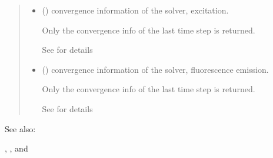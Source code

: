 \documentclass[letterpaper,10pt,english]{sphinxmanual}
\begin{document}
\begin{fulllineitems}
\begin{quote}
\begin{description}
\begin{itemize}
\sphinxAtStartPar
See {\hyperref[\detokenize{_autosummary/nirfasterff.base.data.flTPSFdata:nirfasterff.base.data.flTPSFdata}]{}} for details.

\item {} 
\sphinxAtStartPar
{} () \textendash{} convergence information of the solver, excitation.

\sphinxAtStartPar
Only the convergence info of the last time step is returned.

\sphinxAtStartPar
See {\hyperref[\detokenize{_autosummary/nirfasterff.utils.ConvergenceInfo:nirfasterff.utils.ConvergenceInfo}]{}} for details

\item {} 
\sphinxAtStartPar
{} () \textendash{} convergence information of the solver, fluorescence emission.

\sphinxAtStartPar
Only the convergence info of the last time step is returned.

\sphinxAtStartPar
See {\hyperref[\detokenize{_autosummary/nirfasterff.utils.ConvergenceInfo:nirfasterff.utils.ConvergenceInfo}]{}} for details

\end{itemize}


\end{description}\end{quote}


\begin{sphinxseealso}{See also:}

\sphinxAtStartPar
{\hyperref[\detokenize{_autosummary/nirfasterff.math.gen_mass_matrix:nirfasterff.math.gen_mass_matrix}]{}}, {\hyperref[\detokenize{_autosummary/nirfasterff.math.get_field_TR:nirfasterff.math.get_field_TR}]{}}, and {\hyperref[\detokenize{_autosummary/nirfasterff.math.get_field_TRFL:nirfasterff.math.get_field_TRFL}]{}}


\end{sphinxseealso}


\end{fulllineitems}
\end{document}
